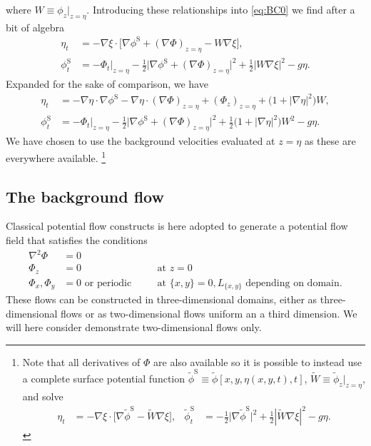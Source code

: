 \documentclass[a4paper,12pt]{article}
\newcommand{\mr}{\mathrm}
\renewcommand{\S}{^\mr{S}}
\newcommand{\phit}{\tilde\phi}
\begin{document}
where $W\equiv \phi_z\big|_{z=\eta}$.
Introducing these relationships into \eqref{eq:BC0} we find after a bit of algebra
\begin{subequations}
\begin{align}
\eta_t &= - \nabla \xi\cdot\big[\nabla\phi\S + (\nabla\Phi)_{z=\eta} - W\nabla\xi\big], 
\\
\phi\S_t &= -\Phi_t\big|_{z=\eta} - \frac12\big|\nabla\phi\S +(\nabla\Phi)_{z=\eta}\big|^2 + \frac12|W\nabla\xi|^2 - g\eta.
\end{align}
\label{eq:BCS}
\end{subequations}
Expanded for the sake of comparison, we have
\begin{align*}
\eta_t &=   - \nabla\eta\cdot\nabla\phi\S  - \nabla\eta\cdot(\nabla\Phi)_{z=\eta} + (\Phi_z)_{z=\eta}   + \big(1+|\nabla\eta|^2\big)W, 
\\
\phi\S_t &= -\Phi_t\big|_{z=\eta} - \frac12\big|\nabla\phi\S +(\nabla\Phi)_{z=\eta}\big|^2 + \frac12\big(1+|\nabla\eta|^2\big)W^2 - g\eta.
\end{align*}
%
We have chosen to use the background velocities evaluated at $z=\eta$ as these are everywhere available.%
\footnote{Note that all derivatives of $\Phi$ are also available so it is possible to instead use a complete surface potential function $\phit\S\equiv\phit[x,y,\eta(x,y,t),t]$, $\tilde W\equiv \phit_z\big|_{z=\eta}$, and solve
\begin{align*}
\eta_t &= - \nabla \xi\cdot\big[\nabla\phit\S - \tilde W\nabla\xi\big], 
&
\phit\S_t &= - \frac12\big|\nabla\phit\S\big|^2 + \frac12|\tilde W\nabla\xi|^2 - g\eta.
\end{align*}
}

\subsection{The background flow}
Classical potential flow constructs is here adopted to generate a potential flow field that satisfies the conditions
\begin{subequations}
\begin{alignat}{2}
\nabla^2\Phi &= 0 &\quad&\\
\Phi_z &=0 & &\text{at } z=0\\
\Phi_x, \Phi_y &= 0\text{ or periodic} & &\text{at } \{x,y\} = 0,L_{\{x,y\}} \text{ depending on domain.}
\label{eq:}%
\end{alignat}%
\end{subequations}%
These flows can be constructed in three-dimensional domains, either as three-dimensional flows or as two-dimensional flows uniform an a third dimension.
We will here consider demonstrate two-dimensional flows only.
\end{document}
